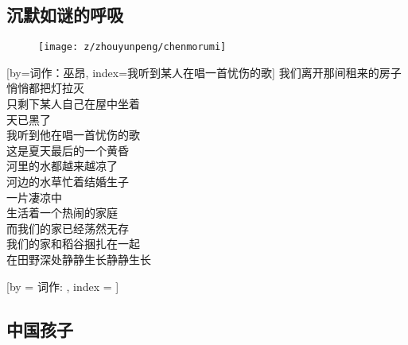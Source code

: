 

\subsection{沉默如谜的呼吸} %

\begin{figure}[htp] %
	\begin{center}
	  \texttt{[image: z/zhouyunpeng/chenmorumi]} %
	  \label{fig:chenmorumi}
	\end{center}
\end{figure}

\begin{songs}{} %
  [by={词作：巫昂}, index={我听到某人在唱一首忧伤的歌}] %
	我们离开那间租来的房子	\\  %
	悄悄都把灯拉灭	\\
	只剩下某人自己在屋中坐着	\\
	天已黑了	\\
	我听到他在唱一首忧伤的歌	\\
	\vspace{2ex}    %
	这是夏天最后的一个黄昏	\\
	河里的水都越来越凉了	\\
	河边的水草忙着结婚生子	\\
	一片凄凉中	\\
	生活着一个热闹的家庭	\\
	而我们的家已经荡然无存	\\
	我们的家和稻谷捆扎在一起	\\
	在田野深处静静生长静静生长	\\
  \endsong
  
  \beginsong{}[by = {词作: }, index = {}] %
  
  \endsong
\end{songs}

\subsection{中国孩子}   %

